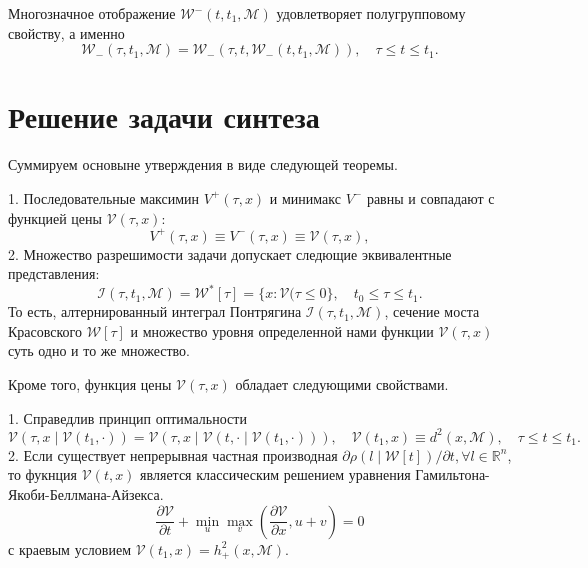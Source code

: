 \begin{lemma}
    Многозначное отображение \( \mathcal{W}^-(t, t_1, \mathcal{M}) \) удовлетворяет полугрупповому
     свойству, а именно
    \[
        \mathcal{W}_-(\tau, t_1, \mathcal{M}) = \mathcal{W}_-(\tau, t, \mathcal{W}_-(t, t_1,
         \mathcal{M})), \quad \tau \le t \le t_1.
    \]

\end{lemma}


\section{Решение задачи синтеза}
Суммируем основыне утверждения в виде следующей теоремы.
\begin{theorem}
    1. Последовательные максимин \( V^+(\tau, x) \) и минимакс \( V^-\) равны и совпадают с функцией
     цены \( \mathcal{V}(\tau,x) \):
    \[
        V^+(\tau, x) \equiv V^-(\tau, x) \equiv \mathcal{V}(\tau, x),
    \]
    2. Множество разрешимости задачи допускает следющие эквивалентные представления:
    \[
        \mathcal{I}(\tau, t_1, \mathcal{M}) = \mathcal{W}^*[\tau] = \{ x : \mathcal{V}(\tau \le 0 \},
         \quad t_0 \le \tau \le t_1.
    \]
    То есть, алтернированный интеграл Понтрягина \( \mathcal{I}(\tau, t_1, \mathcal{M}) \), сечение
     моста Красовского \( \mathcal{W}[\tau] \) и множество уровня определенной нами функции
     \( \mathcal{V}(\tau, x) \) суть одно и то же множество. 
\end{theorem}

Кроме того, функция цены \( \mathcal{V}(\tau, x) \) обладает следующими свойствами.
\begin{theorem}
    1. Справедлив принцип оптимальности
    \[
        \mathcal{V}(\tau, x \mid \mathcal{V}(t_1, \cdot)) = \mathcal{V}(\tau, x \mid \mathcal{V}(t, 
         \cdot \mid \mathcal{V}(t_1, \cdot))), \quad \mathcal{V}(t_1, x) \equiv d^2(x, \mathcal{M}),
         \quad \tau \le t \le t_1. 
    \]
    2. Если существует непрерывная частная производная \( \partial \rho(l \mid \mathcal{W}[t]) / 
     \partial t, \forall l \in \mathbb{R}^n \), то фукнция \( \mathcal{V}(t, x) \) является 
     классическим решением уравнения Гамильтона-Якоби-Беллмана-Айзекса.
    \[
        \frac{\partial \mathcal{V}}{\partial t} + \min_u \max_v \left( \frac{\partial \mathcal{V}}
         {\partial x}, u + v \right) = 0
    \]
    с краевым условием \( \mathcal{V}(t_1, x) = h_+^2(x, \mathcal{M}) \).
\end{theorem}

